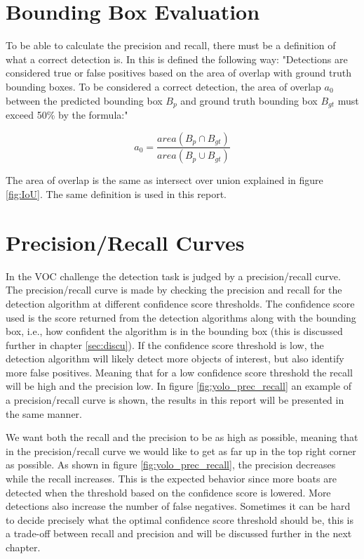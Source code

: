 \newpage

\section{Bounding Box Evaluation}
To be able to calculate the precision and recall, there must be a definition of what a correct detection is. In \citep{Everinghama} this is defined the following way: "Detections are considered true or false positives based on the area of overlap
with ground truth bounding boxes. To be considered a correct detection, the area of overlap $a_0$ between the predicted bounding box $B_p$ and ground truth bounding box $B_{gt}$ must exceed 50\% by the formula:"

\begin{equation*}
    a_0 = \frac{area(B_p \cap B_{gt}) }{area(B_p \cup B_{gt})}
\end{equation*}

The area of overlap is the same as intersect over union explained in figure \ref{fig:IoU}. The same definition is used in this report.




\section{Precision/Recall Curves}

In the VOC challenge \citep{Everinghama} the detection task is judged by a precision/recall curve. The precision/recall curve is made by checking the precision and recall for the detection algorithm at different confidence score thresholds. The confidence score used is the score returned from the detection algorithms along with the bounding box, i.e., how confident the algorithm is in the bounding box (this is discussed further in chapter \ref{sec:discu}). If the confidence score threshold is low, the detection algorithm will likely detect more objects of interest, but also identify more false positives. Meaning that for a low confidence score threshold the recall will be high and the precision low. In figure \ref{fig:yolo_prec_recall} an example of a precision/recall curve is shown, the results in this report will be presented in the same manner. 

\vspace{3mm}

We want both the recall and the precision to be as high as possible, meaning that in the precision/recall curve we would like to get as far up in the top right corner as possible. As shown in figure \ref{fig:yolo_prec_recall}, the precision decreases while the recall increases. This is the expected behavior since more boats are detected when the threshold based on the confidence score is lowered. More detections also increase the number of false negatives. Sometimes it can be hard to decide precisely what the optimal confidence score threshold should be, this is a trade-off between recall and precision and will be discussed further in the next chapter. 

